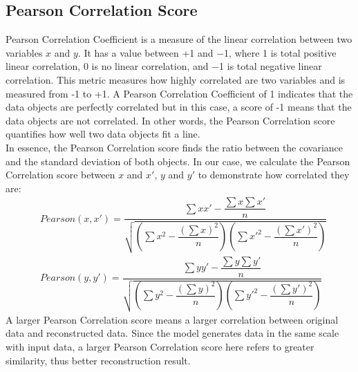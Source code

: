 \documentclass[12pt]{report} %
\begin{document}
\subsection{Pearson Correlation Score}
Pearson Correlation Coefficient\cite{PCC, PCC2} is a measure of the linear correlation between two variables $x$ and $y$. It has a value between +1 and −1, where 1 is total positive linear correlation, 0 is no linear correlation, and −1 is total negative linear correlation. This metric measures how highly correlated are two variables and is measured from -1 to +1. A Pearson Correlation Coefficient of 1 indicates that the data objects are perfectly correlated but in this case, a score of -1 means that the data objects are not correlated. In other words, the Pearson Correlation score quantifies how well two data objects fit a line. \\
In essence, the Pearson Correlation score finds the ratio between the covariance and the standard deviation of both objects. In our case, we calculate the Pearson Correlation score between $x$ and $x'$, $y$ and $y'$ to demonstrate how correlated they are:
\begin{equation}
\begin{split}
&Pearson(x,x')= \dfrac{\sum xx'-\dfrac{\sum x \sum x'}{n}}{\sqrt{(\sum x^2-\dfrac{(\sum x)^2}{n})(\sum x'^2-\dfrac{(\sum x')^2}{n})}}\\
&Pearson(y,y')= \dfrac{\sum yy'-\dfrac{\sum y \sum y'}{n}}{\sqrt{(\sum y^2-\dfrac{(\sum y)^2}{n})(\sum y'^2-\dfrac{(\sum y')^2}{n})}}
\end{split}
\end{equation}
A larger Pearson Correlation score means a larger correlation between original data and reconstructed data. Since the model generates data in the same scale with input data, a larger Pearson Correlation score here refers to greater similarity, thus better reconstruction result.
\end{document}
